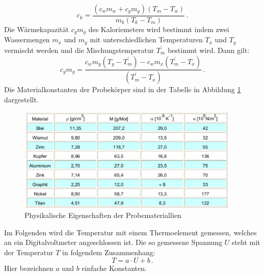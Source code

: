 \begin{equation}
  c_k = \frac{(c_w m_w + c_g m_g)(T_m - T_w)}{m_k ( T_k - T_m)}\, .
  \label{eqn:ck}
\end{equation}
Die Wärmekapazität $c_g m_g$ des Kaloriemeters wird bestimmt indem zwei
Wassermengen $ m_x $ und $m_y$ mit unterschiedlichen Temperaturen $T_x$ und
$T_y$ vermischt werden und die Mischungstemperatur $T_m ^{'}$ bestimmt wird.
Dann gilt:
\begin{equation}
  c_gm_g = \frac{c_w m_y (T_y - T_m ^{'})- c_w m_x (T_m ^{'} - T_x)}{(T_m ^{'} - T_x)} \, .
  \label{eqn:cgmg}
\end{equation}
Die Materialkonstanten der Probekörper sind in der Tabelle in
Abbildung \ref{fig:tab} dargestellt.
\begin{figure}
  \centering
  \includegraphics[height=5cm]{logos/tab.png}
  \caption{Physikalische Eigenschaften der Probemateriallien \cite{Anleitung}}
  \label{fig:tab}
\end{figure}
Im Folgenden wird die Temperatur mit einem Thermoelement gemessen, welches
an ein Digitalvoltmeter angeschlossen ist. Die so gemessene Spannung $U$
steht mit der Temperatur $T$ in folgendem Zusammenhang:
\begin{equation}
  T = a\cdot U + b \,.
  \label{eqn:TU}
\end{equation}
Hier bezeichnen $ a $ und $b$ einfache Konstanten. 


























%
